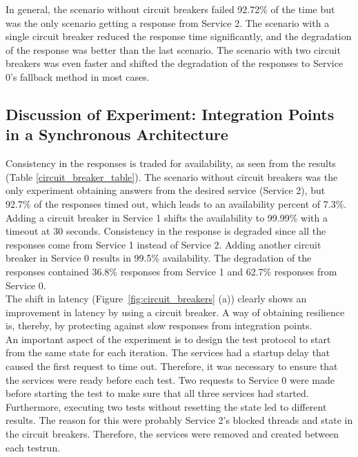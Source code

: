 \noindent
In general, the scenario without circuit breakers failed 92.72\% of the time but was the only scenario getting a response from Service 2. The scenario with a single circuit breaker reduced the response time significantly, and the degradation of the response was better than the last scenario. The scenario with two circuit breakers was even faster and shifted the degradation of the responses to Service 0's fallback method in most cases.

\subsection*{Discussion of Experiment: Integration Points in a Synchronous Architecture}
Consistency in the responses is traded for availability, as seen from the results (Table \ref{circuit_breaker_table}). The scenario without circuit breakers was the only experiment obtaining answers from the desired service (Service 2), but 92.7\% of the responses timed out, which leads to an availability percent of 7.3\%. Adding a circuit breaker in Service 1 shifts the availability to 99.99\% with a timeout at 30 seconds. Consistency in the response is degraded since all the responses come from Service 1 instead of Service 2. Adding another circuit breaker in Service 0 results in 99.5\% availability. The degradation of the responses contained 36.8\% responses from Service 1 and 62.7\% responses from Service 0.  \\

\noindent
The shift in latency (Figure~\ref{fig:circuit_breakers} (a)) clearly shows an improvement in latency by using a circuit breaker. A way of obtaining resilience is, thereby, by protecting against slow responses from integration points. \\



\noindent
An important aspect of the experiment is to design the test protocol to start from the same state for each iteration. The services had a startup delay that caused the first request to time out. Therefore, it was necessary to ensure that the services were ready before each test.
Two requests to Service 0 were made before starting the test to make sure that all three services had started. Furthermore, executing two tests without resetting the state led to different results. The reason for this were probably Service 2's blocked threads and state in the circuit breakers. Therefore, the services were removed and created between each testrun.


